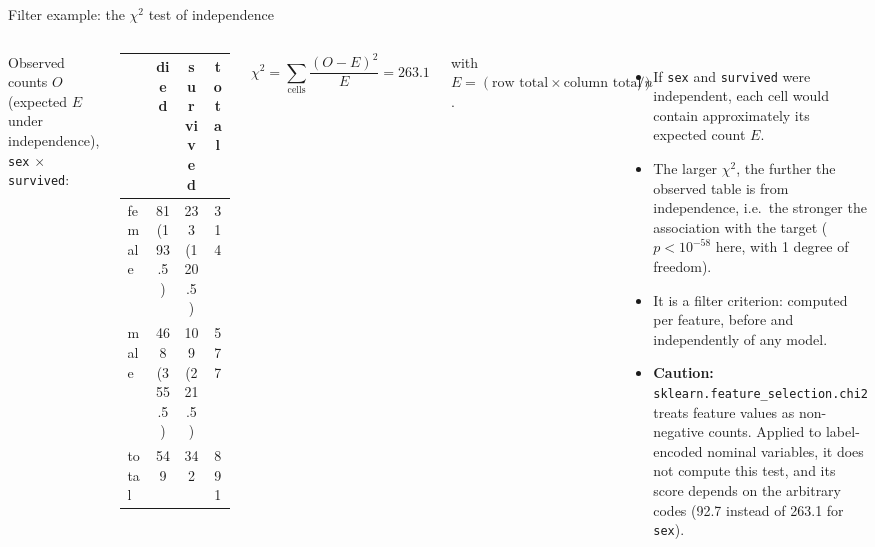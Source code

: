 \begin{frame}{Filter example: the $\chi^2$ test of independence}
\begin{columns}[T]
\begingroup\small
Observed counts $O$ (expected $E$ under independence), \texttt{sex} $\times$ \texttt{survived}:
\par\endgroup
\vspace{0.4em}
\centering
\begingroup\footnotesize
\begin{tabular}{l c c c}
& died & survived & total \\
\toprule
female & 81 \textcolor{coursegray}{(193.5)} & 233 \textcolor{coursegray}{(120.5)} & 314 \\
male & 468 \textcolor{coursegray}{(355.5)} & 109 \textcolor{coursegray}{(221.5)} & 577 \\
\midrule
total & 549 & 342 & 891 \\
\bottomrule
\end{tabular}
\par\endgroup
\vspace{0.6em}
\[
\chi^2 = \sum_{\text{cells}} \frac{(O - E)^2}{E} = 263.1
\]
\vspace{-0.4em}
{\footnotesize with $E = (\text{row total} \times \text{column total})/n$.\par}
\begin{itemize}\footnotesize
\item If \texttt{sex} and \texttt{survived} were independent, each cell would contain approximately its expected count $E$.
\item The larger $\chi^2$, the further the observed table is from independence, i.e.\ the stronger the association with the target ($p < 10^{-58}$ here, with 1 degree of freedom).
\item It is a filter criterion: computed per feature, before and independently of any model.
\item \textbf{Caution:} \texttt{sklearn.feature\_selection.chi2} treats feature values as non-negative counts. Applied to label-encoded nominal variables, it does not compute this test, and its score depends on the arbitrary codes (92.7 instead of 263.1 for \texttt{sex}).
\end{itemize}
\end{columns}
\coursefooter
\end{frame}

